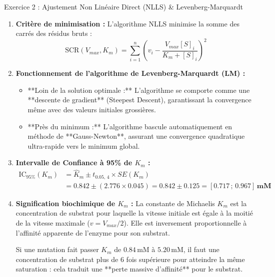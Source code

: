 \documentclass[11pt,a4paper]{article}
\begin{document}
\begin{solutionbox}{Exercice 2 : Ajustement Non Linéaire Direct (NLLS) \& Levenberg-Marquardt}
\begin{enumerate}[label=\textbf{\alph*.}]
  \item \textbf{Critère de minimisation :}
  L'algorithme NLLS minimise la somme des carrés des résidus bruts :
  \begin{equation*}
    \text{SCR}(V_{max}, K_m) = \sum_{i=1}^n \left( v_i - \frac{V_{max} [S]_i}{K_m + [S]_i} \right)^2
  \end{equation*}

  \item \textbf{Fonctionnement de l'algorithme de Levenberg-Marquardt (LM) :}
  \begin{itemize}
    \item **Loin de la solution optimale :** L'algorithme se comporte comme une **descente de gradient** (Steepest Descent), garantissant la convergence même avec des valeurs initiales grossières.
    \item **Près du minimum :** L'algorithme bascule automatiquement en méthode de **Gauss-Newton**, assurant une convergence quadratique ultra-rapide vers le minimum global.
  \end{itemize}

  \item \textbf{Intervalle de Confiance à 95\% de $K_m$ :}
  \begin{align*}
    \text{IC}_{95\%}(K_m) &= \hat{K}_m \pm t_{0.05, \, 4} \times SE(K_m) \\
    &= 0.842 \pm (2.776 \times 0.045) = 0.842 \pm 0.125 = \mathbf{[0.717 \,;\, 0.967]\,\text{mM}}
  \end{align*}

  \item \textbf{Signification biochimique de $K_m$ :}
  La constante de Michaelis $K_m$ est la concentration de substrat pour laquelle la vitesse initiale est égale à la moitié de la vitesse maximale ($v = V_{max}/2$). Elle est inversement proportionnelle à l'affinité apparente de l'enzyme pour son substrat.
  \par Si une mutation fait passer $K_m$ de $0.84\,\text{mM}$ à $5.20\,\text{mM}$, il faut une concentration de substrat plus de 6 fois supérieure pour atteindre la même saturation : cela traduit une **perte massive d'affinité** pour le substrat.
\end{enumerate}
\end{solutionbox}
\end{document}
